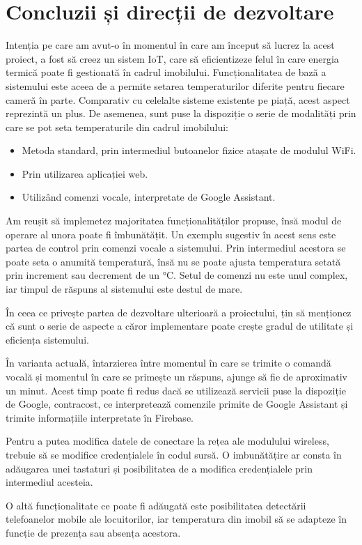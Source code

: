 \chapter{Concluzii și direcții de dezvoltare}\label{ch:6concluzii}

	Intenția pe care am avut-o în momentul în care am început să lucrez la acest proiect, a fost să creez un sistem IoT, care să eficientizeze felul în care energia termică poate fi gestionată în cadrul imobilului. Funcționalitatea de bază a sistemului este aceea de a permite setarea temperaturilor diferite pentru fiecare cameră în parte. Comparativ cu celelalte sisteme existente pe piață, acest aspect reprezintă un plus. De asemenea, sunt puse la dispoziție o serie de modalități prin care se pot seta temperaturile din cadrul imobilului:
	\begin{itemize}
  	\setlength{\itemindent}{2em}
		\itemsep0em
		\item Metoda standard, prin intermediul butoanelor fizice atașate de modulul WiFi.
		\item Prin utilizarea aplicației web.
		\item Utilizând comenzi vocale, interpretate de Google Assistant. 
	\end{itemize} 

\vspace{1em}
	Am reușit să implemetez majoritatea funcționalităților propuse, însă modul de operare al unora poate fi îmbunătățit. Un exemplu sugestiv în acest sens este partea de control prin comenzi vocale a sistemului. Prin intermediul acestora se poate seta o anumită temperatură, însă nu se poate ajusta temperatura setată prin increment sau decrement de un °C. Setul de comenzi nu este unul complex, iar timpul de răspuns al sistemului este destul de mare. 

\vspace{1em}
	În ceea ce privește partea de dezvoltare ulterioară a proiectului, țin să menționez că sunt o serie de aspecte a căror implementare poate crește gradul de utilitate și eficiența sistemului.

	În varianta actuală, întarzierea între momentul în care se trimite o comandă vocală și momentul în care se primește un răspuns, ajunge să fie de aproximativ un minut. Acest timp poate fi redus dacă se utilizează servicii puse la dispoziție de Google, contracost, ce interpretează comenzile primite de Google Assistant și trimite informațiile interpretate în Firebase. 

	Pentru a putea modifica datele de conectare la rețea ale modulului wireless, trebuie să se modifice credențialele în codul sursă. O imbunătățire ar consta în adăugarea unei tastaturi și posibilitatea de a modifica credențialele prin intermediul acesteia. 

	O altă funcționalitate ce poate fi adăugată este posibilitatea detectării telefoanelor mobile ale locuitorilor, iar temperatura din imobil să se adapteze în funcție de prezența sau absența acestora.
	  
